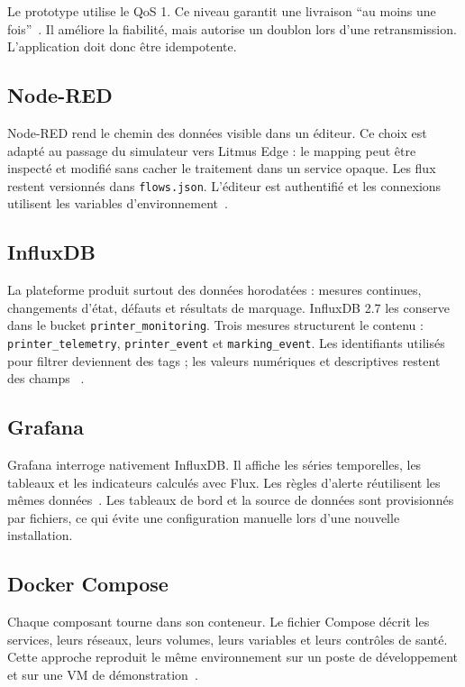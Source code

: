 Le prototype utilise le QoS 1. Ce niveau garantit une livraison ``au moins une
fois''~\cite{mqtt5}. Il améliore la fiabilité, mais autorise un doublon lors
d'une retransmission. L'application doit donc être idempotente.

\subsection{Node-RED}

Node-RED rend le chemin des données visible dans un éditeur. Ce choix est
adapté au passage du simulateur vers Litmus Edge : le mapping peut être
inspecté et modifié sans cacher le traitement dans un service opaque. Les flux
restent versionnés dans \texttt{flows.json}. L'éditeur est authentifié et les
connexions utilisent les variables d'environnement~\cite{nodered}.

\subsection{InfluxDB}

La plateforme produit surtout des données horodatées : mesures continues,
changements d'état, défauts et résultats de marquage. InfluxDB 2.7 les conserve
dans le bucket \texttt{printer\_monitoring}. Trois mesures structurent le
contenu : \texttt{printer\_telemetry}, \texttt{printer\_event} et
\texttt{marking\_event}. Les identifiants utilisés pour filtrer deviennent des
tags ; les valeurs numériques et descriptives restent des champs
~\cite{influxschema}.

\subsection{Grafana}

Grafana interroge nativement InfluxDB. Il affiche les séries temporelles, les
tableaux et les indicateurs calculés avec Flux. Les règles d'alerte réutilisent
les mêmes données~\cite{grafanainflux}. Les tableaux de bord et
la source de données sont provisionnés par fichiers, ce qui évite une
configuration manuelle lors d'une nouvelle installation.

\subsection{Docker Compose}

Chaque composant tourne dans son conteneur. Le fichier Compose décrit les
services, leurs réseaux, leurs volumes, leurs variables et leurs contrôles de
santé. Cette approche reproduit le même environnement sur un poste de
développement et sur une VM de démonstration~\cite{dockercompose}.

